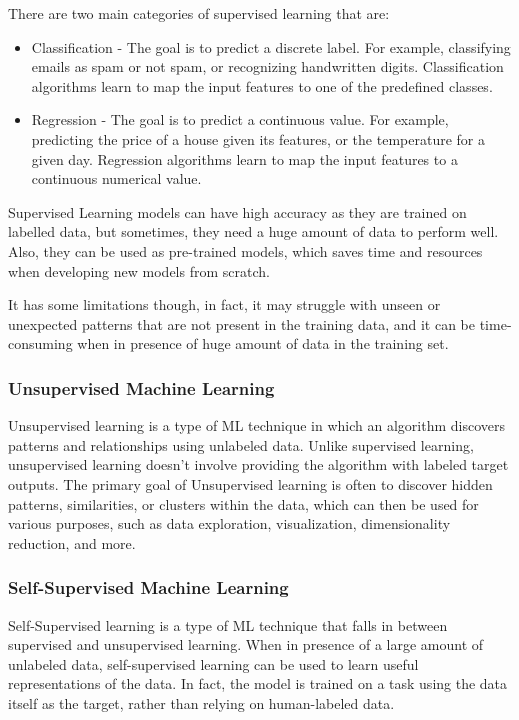 There are two main categories of supervised learning that are:
\begin{itemize}
    \item Classification - The goal is to predict a discrete label.
    For example, classifying emails as spam or not spam, or recognizing handwritten digits.
    Classification algorithms learn to map the input features to one of the predefined classes.

    \item Regression - The goal is to predict a continuous value.
    For example, predicting the price of a house given its features, or the temperature for a given day.
    Regression algorithms learn to map the input features to a continuous numerical value.

\end{itemize}

Supervised Learning models can have high accuracy as they are trained on labelled data, but sometimes, they need a huge amount of data to perform well.
Also, they can be used as pre-trained models, which saves time and resources when developing new models from scratch.

It has some limitations though, in fact, it may struggle with unseen or unexpected patterns that are not present in the training data, and it can be time-consuming when in presence of huge amount of data in the training set.

\subsubsection{Unsupervised Machine Learning}
\label{subsubsec:unsupervised_ml}
Unsupervised learning is a type of ML technique in which an algorithm discovers patterns and relationships using unlabeled data.
Unlike supervised learning, unsupervised learning doesn’t involve providing the algorithm with labeled target outputs.
The primary goal of Unsupervised learning is often to discover hidden patterns, similarities, or clusters within the data, which can then be used for various purposes, such as data exploration, visualization, dimensionality reduction, and more.







\subsubsection{Self-Supervised Machine Learning}
\label{sec:semisupervised_ml}
Self-Supervised learning is a type of ML technique that falls in between supervised and unsupervised learning.
When in presence of a large amount of unlabeled data, self-supervised learning can be used to learn useful representations of the data.
In fact, the model is trained on a task using the data itself as the target, rather than relying on human-labeled data.



